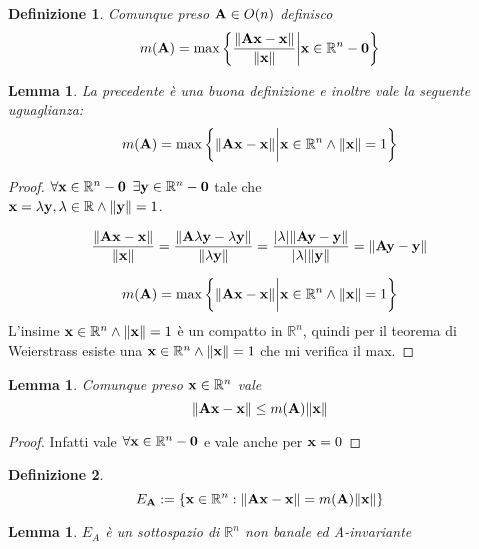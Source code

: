 \documentclass[10pt,a4paper]{article}
\newtheorem{definition}{Definizione}[section]
\newtheorem{lemma}[theorem]{Lemma}
\begin{document}
\begin{definition}
Comunque preso  $  \vb{A} \in O(n) $  definisco
\[ m(\vb{A}) = \max \bigg\{ \frac{\norm{\vb{Ax-x}}}{\norm{\vb{x}}} \bigg|  \vb{x} \in \mathbb{R}^{n}-\vb{0} \bigg\} \]
\end{definition}

\begin{lemma}
La precedente è una buona definizione e inoltre vale la seguente uguaglianza: 
\[ m(\vb{A}) = \max \bigg\{ \norm{\vb{Ax-x}} \bigg|  \vb{x} \in \mathbb{R}^{n} \land \norm{\vb{x}} = 1 \bigg\} \]
\end{lemma}

\begin{proof}
$ \forall \vb{x} \in \mathbb{R}^{n}-\vb{0}$  $ \exists \vb{y} \in \mathbb{R}^{n}-\vb{0} $ tale che \\$\vb{x} = \lambda \vb{y} , \lambda \in \mathbb{R} \land \norm{\vb{y}} = 1 $. 

\[ \frac{\norm{\vb{Ax-x}}}{\norm{\vb{x}}} = \frac{\norm{\vb{A}\lambda \vb{y}-\lambda \vb{y}}}{\norm{\lambda \vb{y}}} =   \frac{|\lambda| \norm{\vb{Ay-y}}}{|\lambda| \norm{\vb{ y}}} = \norm{\vb{Ay-y}} \]

\[ m(\vb{A}) = \max \bigg\{ \norm{\vb{Ax-x}} \bigg|  \vb{x} \in \mathbb{R}^{n} \land \norm{\vb{x}} = 1 \bigg\}\] L'insime $\vb{x} \in \mathbb{R}^{n} \land \norm{\vb{x}} = 1 $  è un compatto in  $\mathbb{R}^{n}$, quindi per il teorema di Weierstrass esiste una $\vb{x} \in \mathbb{R}^{n} \land \norm{\vb{x}} = 1$ che mi verifica il max. 
\end{proof}

\begin{lemma}
Comunque preso $ \vb{x} \in \mathbb{R}^{n}$  vale  \[ \norm{\vb{Ax-x}} \leq m(\vb{A}) \norm{\vb{x}} \]
\end{lemma}

\begin{proof}
Infatti vale $\forall \vb{x} \in \mathbb{R}^{n}-\vb{0}$  e vale anche per  $\vb{x}=0$
\end{proof}

\begin{definition}
\[ E_{\vb{A}} := \{ \vb{x} \in \mathbb{R}^{n} :  \norm{\vb{Ax - x}} = m(\vb{A}) \norm{\vb{x}}\} \]
\end{definition}

\begin{lemma}
$E_A$ è un sottospazio di $\mathbb{R}^{n}$ non banale ed A-invariante
\end{lemma} 
\end{document}

